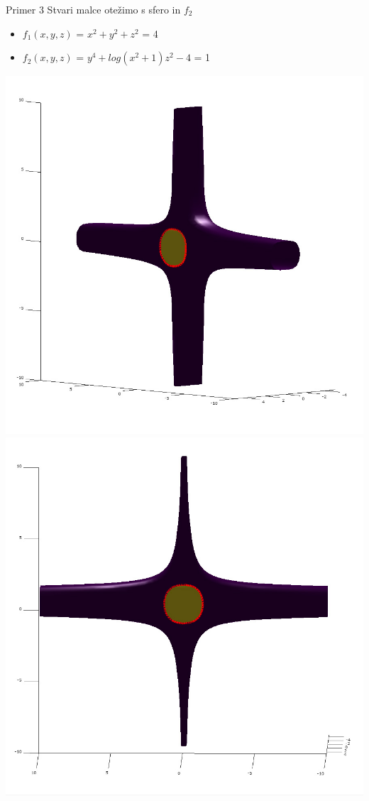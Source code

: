 \documentclass{beamer}
\begin{document}
\begin{frame}{Primer 3}
	Stvari malce otežimo s sfero in $f_{2}$
	
	\begin{itemize}  
		\item $f_{1}(x,y,z)$ = $x^2 + y^2 + z^2$ = 4
		\item $f_{2}(x,y,z)$ = $y^4 + log(x^2 + 1)z^2 - 4$ = 1
	\end{itemize} 
	\includegraphics[scale=0.3]{primer3_1}
	\includegraphics[scale=0.3]{primer3_2}
\end{frame}
\end{document}
